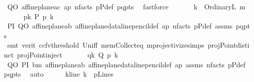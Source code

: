 \begin{isabellebody}
\ QO\ affine{\isacharunderscore}{\kern0pt}plane{\isachardot}{\kern0pt}a{}c\ ap\ n{\isacharunderscore}{\kern0pt}facts\ pPdef\ pq{\isacharunderscore}{\kern0pt}pts\ \isamarkupfalse%
\ fastforce\ \isanewline
\ \ \ \ \isamarkupfalse%
\ {\isacharquery}{\kern0pt}k\ {\isacharequal}{\kern0pt}\ {\isachardoublequoteopen}OrdinaryL\ {\isacharquery}{\kern0pt}m{\isachardoublequoteclose}\isanewline
\ \ \ \ \isamarkupfalse%
\ pk{\isacharcolon}{\kern0pt}\ {\isachardoublequoteopen}P\ p{\isasymlhd}\ {\isacharquery}{\kern0pt}k{\isachardoublequoteclose}\isanewline
\ \ \ \ \isamarkupfalse%
\ PI\ QO\ affine{\isacharunderscore}{\kern0pt}plane{\isachardot}{\kern0pt}a{}b\ affine{\isacharunderscore}{\kern0pt}plane{\isacharunderscore}{\kern0pt}data{\isachardot}{\kern0pt}line{\isacharunderscore}{\kern0pt}pencil{\isacharunderscore}{\kern0pt}def\ ap\ n{\isacharunderscore}{\kern0pt}facts\ pPdef\ assms\ pq{\isacharunderscore}{\kern0pt}pts\ \isanewline
\ \ \ \ \ \ \isamarkupfalse%
\ {\isacharparenleft}{\kern0pt}smt\ {\isacharparenleft}{\kern0pt}verit{\isacharcomma}{\kern0pt}\ ccfv{\isacharunderscore}{\kern0pt}threshold{\isacharparenright}{\kern0pt}\ Un{\isacharunderscore}{\kern0pt}iff\ mem{\isacharunderscore}{\kern0pt}Collect{\isacharunderscore}{\kern0pt}eq\ mprojectivize{\isachardot}{\kern0pt}simps{\isacharparenleft}{\kern0pt}{}{\isacharparenright}{\kern0pt}\ projPoint{\isachardot}{\kern0pt}distinct{\isacharparenleft}{\kern0pt}{}{\isacharparenright}{\kern0pt}\ projPoint{\isachardot}{\kern0pt}inject{\isacharparenleft}{\kern0pt}{}{\isacharparenright}{\kern0pt}{\isacharparenright}{\kern0pt}\ \isanewline
\ \ \ \ \isamarkupfalse%
\ qk{\isacharcolon}{\kern0pt}\ {\isachardoublequoteopen}Q\ p{\isasymlhd}\ {\isacharquery}{\kern0pt}k{\isachardoublequoteclose}\ \isamarkupfalse%
\ QO\ PI\ bm\ affine{\isacharunderscore}{\kern0pt}plane{\isachardot}{\kern0pt}a{}b\ affine{\isacharunderscore}{\kern0pt}plane{\isacharunderscore}{\kern0pt}data{\isachardot}{\kern0pt}line{\isacharunderscore}{\kern0pt}pencil{\isacharunderscore}{\kern0pt}def\ ap\ assms\ n{\isacharunderscore}{\kern0pt}facts\ pPdef\ pq{\isacharunderscore}{\kern0pt}pts\ \isamarkupfalse%
\ auto\isanewline
\ \ \ \ \isamarkupfalse%
\ k{\isacharunderscore}{\kern0pt}line{\isacharcolon}{\kern0pt}\ {\isachardoublequoteopen}{\isacharquery}{\kern0pt}k\ {\isasymin}\ pLines{\isachardoublequoteclose}\ \isamarkupfalse%

\end{isabellebody}
